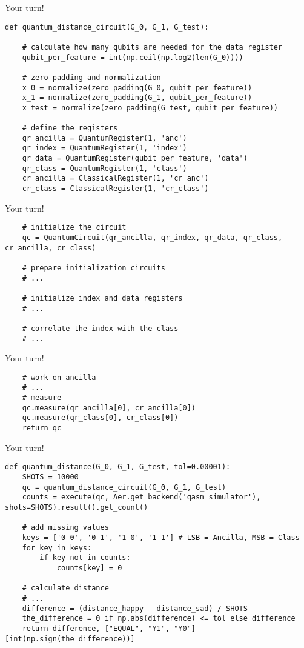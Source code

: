 \begin{frame}[fragile]{Your turn!}
\begin{verbatim}
def quantum_distance_circuit(G_0, G_1, G_test):

    # calculate how many qubits are needed for the data register
    qubit_per_feature = int(np.ceil(np.log2(len(G_0))))
    
    # zero padding and normalization
    x_0 = normalize(zero_padding(G_0, qubit_per_feature))
    x_1 = normalize(zero_padding(G_1, qubit_per_feature))
    x_test = normalize(zero_padding(G_test, qubit_per_feature))
    
    # define the registers
    qr_ancilla = QuantumRegister(1, 'anc')
    qr_index = QuantumRegister(1, 'index')
    qr_data = QuantumRegister(qubit_per_feature, 'data')
    qr_class = QuantumRegister(1, 'class')
    cr_ancilla = ClassicalRegister(1, 'cr_anc')
    cr_class = ClassicalRegister(1, 'cr_class')
\end{verbatim}
\end{frame}

\begin{frame}[fragile]{Your turn!}
\begin{verbatim}
    # initialize the circuit
    qc = QuantumCircuit(qr_ancilla, qr_index, qr_data, qr_class, cr_ancilla, cr_class)
    
    # prepare initialization circuits
    # ...
    
    # initialize index and data registers
    # ...
    
    # correlate the index with the class
    # ...
\end{verbatim}
\end{frame}

\begin{frame}[fragile]{Your turn!}
\begin{verbatim}
    # work on ancilla
    # ...
    # measure
    qc.measure(qr_ancilla[0], cr_ancilla[0])
    qc.measure(qr_class[0], cr_class[0])
    return qc
\end{verbatim}
\end{frame}

\begin{frame}[fragile]{Your turn!}
\begin{verbatim}
def quantum_distance(G_0, G_1, G_test, tol=0.00001):
    SHOTS = 10000
    qc = quantum_distance_circuit(G_0, G_1, G_test)
    counts = execute(qc, Aer.get_backend('qasm_simulator'), shots=SHOTS).result().get_count()
    
    # add missing values
    keys = ['0 0', '0 1', '1 0', '1 1'] # LSB = Ancilla, MSB = Class
    for key in keys:
        if key not in counts:
            counts[key] = 0

    # calculate distance
    # ...
    difference = (distance_happy - distance_sad) / SHOTS
    the_difference = 0 if np.abs(difference) <= tol else difference
    return difference, ["EQUAL", "Y1", "Y0"][int(np.sign(the_difference))]
\end{verbatim}
\end{frame}

